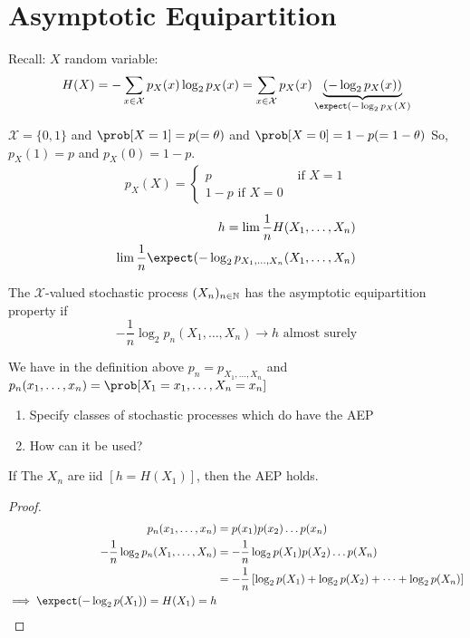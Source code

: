 \documentclass[mfit.tex]{subfiles}
\begin{document}
\section{Asymptotic Equipartition}

Recall: $X$ random variable: 
\[ H(X) = - \sum_{x \in \mathcal{X}} p_X(x) \log_2 p_X(x) = \sum_{x \in \mathcal{X}} p_X(x) \underbrace{(-\log_2 p_X(x))}_{\expect(-\log_2 p_X(X)} \]

\begin{ex}
  $\mathcal{X} = \{0,1\}$ and $\prob[X=1] = p (= \theta)$ and $\prob[X=0] = 1 - p (= 1 - \theta)$
  So, $p_X(1) = p$ and $p_X(0) = 1-p$.
  \begin{align*}
    p_X(X) = \begin{cases} p & \text{ if } X = 1 \\ 1-p \text{ if } X=0 \end{cases}
  \end{align*}
  \begin{align*}
    h = \lim \frac{1}{n} H(X_1,\dots,X_n)\\
    \lim \frac{1}{n} \expect(-\log_2 p_{X_1,\dots,X_n} (X_1,\dots,X_n)
  \end{align*}
\end{ex}

\begin{defi*}
  The $\mathcal{X}$-valued stochastic process $(X_n)_{n \in \mathbb{N}}$ has the asymptotic equipartition property if 
  \[ - \frac{1}{n} \log_2 p_n(X_1,\dots,X_n) \to h \text{ almost surely} \]
\end{defi*}

\begin{rem}
  We have in the definition above $p_n = p_{X_1,\dots,X_n}$ and $p_n(x_1,\dots,x_n) = \prob[X_1=x_1,\dots,X_n=x_n]$
\end{rem}

\begin{enumerate}
  \item Specify classes of stochastic processes which do have the AEP
  \item How can it be used?
\end{enumerate}

\begin{lemma}
  If The $X_n$ are iid $[h = H(X_1)]$, then the AEP holds.
\end{lemma}

\begin{proof}
  \begin{align*}
    p_n(x_1,\dots,x_n) &= p(x_1)p(x_2)\dots p(x_n) \\
    -\frac{1}{n} \log_2 p_n(X_1,\dots,X_n) &= -\frac{1}{n} \log_2 p(X_1)p(X_2)\dots p(X_n) \\
    &= -\frac{1}{n} \left[ \log_2 p(X_1) + \log_2 p(X_2) + \dots + \log_2 p(X_n) \right]\\
    \implies \expect(-\log_2 p(X_1)) = H(X_1) = h
  \end{align*}
\end{proof}
\end{document}
